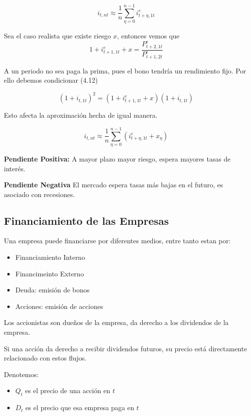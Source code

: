 \begin{equation}
    i_{t, nt} \approx \frac{1}{n} \sum^{n-1}_{\eta=0}i^{e}_{t+\eta,1t}
\end{equation}

Sea el caso realista que existe riesgo $x$, entonces vemos que
\begin{equation}
    1+i^{e}_{t+1,1t}+x =\frac{P_{t+2,1t}^{e}}{P_{t+1,2t}^{e}}
\end{equation}

A un periodo no sea paga la prima, pues el bono tendría un rendimiento fijo. Por ello debemos condicionar (4.12)

\begin{equation}
    (1+i_{t,1t})^{2} = (1+i^{e}_{t+1,1t}+x)(1+i_{t,1t})
\end{equation}

Esto afecta la aproximación hecha de igual manera. 

\begin{equation}
        i_{t, nt} \approx \frac{1}{n} \sum^{n-1}_{\eta=0}(i^{e}_{t+\eta,1t} + x_{\eta})
\end{equation}

\textbf{Pendiente Positiva:}
A mayor plazo mayor riesgo, espera mayores tasas de interés.

\textbf{Pendiente Negativa}
El mercado espera tasas más bajas en el futuro, es asociado con recesiones. 

\subsection{Financiamiento de las Empresas}

Una empresa puede financiarse por diferentes medios, entre tanto estan por:
\begin{itemize}
    \item Financiamiento Interno
    \item Financimeinto Externo
    \item Deuda: emisión de bonos
    \item Acciones: emisión de acciones
\end{itemize}

Los accionistas son dueños de la empresa, da derecho a los dividendos de la empresa. 

Si una acción da derecho a recibir dividendos futuros, su precio está directamente relacionado con estos flujos. 

Denotemos: 

\begin{itemize}
    \item $Q_{t}$ es el precio de una acción en $t$
    \item $D_{t}$ es el precio que esa empresa paga en $t$
\end{itemize}

